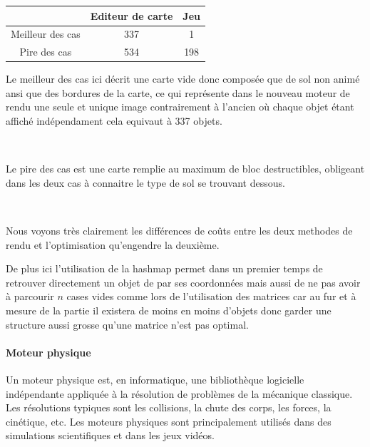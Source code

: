 			\begin{center}
				\begin{tabular}{|c|c|c|} \hline
				  & Editeur de carte & Jeu    \\\hline 
				Meilleur des cas & 337 & 1    \\\hline
				Pire des cas     & 534 & 198  \\\hline		
				\end{tabular}
			\end{center}
			
			Le meilleur des cas ici décrit une carte vide donc composée que de sol non
			animé ansi que des bordures de la carte, ce qui représente dans le nouveau
			moteur de rendu une seule et unique image contrairement à l'ancien où chaque
			objet étant affiché indépendament cela equivaut à 337 objets.
			
			$\,$
			
			Le pire des cas est une carte remplie au maximum de bloc destructibles,
			obligeant dans les deux cas à connaitre le type de sol se trouvant dessous.
			
			$\,$
			
			Nous voyons très clairement les différences de coûts entre les deux methodes
			de rendu et l'optimisation qu'engendre la deuxième.
			
			De plus ici l'utilisation de la hashmap permet dans un premier temps de
			retrouver directement un objet de par ses coordonnées mais aussi de ne pas
			avoir à parcourir $n$ cases vides comme lors de l'utilisation des matrices
			car au fur et à mesure de la partie il existera de moins en moins d'objets
			donc garder une structure aussi grosse qu'une matrice n'est pas optimal.
		
		\paragraph{Moteur physique\\}
		
			\hypertarget{Moteur physique}{}
			\label{Moteur physique}
			
			Un moteur physique est, en informatique, une bibliothèque logicielle 
			indépendante appliquée à la résolution de problèmes de la mécanique
			classique.  Les résolutions typiques sont les collisions, la chute des corps,
			les forces, la cinétique, etc.
			Les moteurs physiques sont principalement utilisés dans des simulations 
			scientifiques et dans les jeux vidéos.
			
